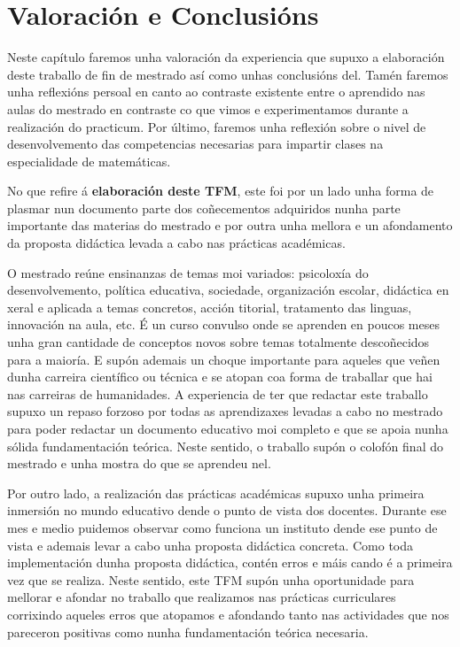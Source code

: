 

\chapter{Valoración e Conclusións}\label{chap:valoracion}

Neste capítulo faremos unha valoración da experiencia que supuxo a elaboración deste traballo de fin de mestrado así como unhas conclusións del. Tamén faremos unha reflexións persoal en canto ao contraste existente entre o aprendido nas aulas do mestrado en contraste co que vimos e experimentamos durante a realización do practicum. Por último, faremos unha reflexión sobre o nivel de desenvolvemento das competencias necesarias para impartir clases na especialidade de matemáticas.


No que refire á \textbf{elaboración deste TFM}, este foi por un lado unha forma de plasmar nun documento parte dos coñecementos adquiridos nunha parte importante das materias do mestrado e por outra unha mellora e un afondamento da proposta didáctica levada a cabo nas prácticas académicas.

O mestrado reúne ensinanzas de temas moi variados: psicoloxía do desenvolvemento, política educativa, sociedade, organización escolar, didáctica en xeral e aplicada a temas concretos, acción titorial, tratamento das linguas, innovación na aula, etc. É un curso convulso onde se aprenden en poucos meses unha gran cantidade de conceptos novos sobre temas totalmente descoñecidos para a maioría. E supón ademais un choque importante para aqueles que veñen dunha carreira científico ou técnica e se atopan coa forma de traballar que hai nas carreiras de humanidades. A experiencia de ter que redactar este traballo supuxo un repaso forzoso por todas as aprendizaxes levadas a cabo no mestrado para poder redactar un documento educativo moi completo e que se apoia nunha sólida fundamentación teórica. Neste sentido, o traballo supón o colofón final do mestrado e unha mostra do que se aprendeu nel.

Por outro lado, a realización das prácticas académicas supuxo unha primeira inmersión no mundo educativo dende o punto de vista dos docentes. Durante ese mes e medio puidemos observar como funciona un instituto dende ese punto de vista e ademais levar a cabo unha proposta didáctica concreta. Como toda implementación dunha proposta didáctica, contén erros e máis cando é a primeira vez que se realiza. Neste sentido, este TFM supón unha oportunidade para mellorar e afondar no traballo que realizamos nas prácticas curriculares corrixindo aqueles erros que atopamos e afondando tanto nas actividades que nos pareceron positivas como nunha fundamentación teórica necesaria.

